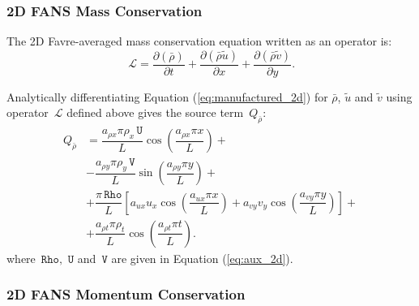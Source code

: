 \documentclass[10pt]{article}
\newcommand{\Diff}[2] {\dfrac{\partial( #1)}{\partial #2}}
\newcommand{\Rho}{\,\mathtt{Rho}}
\newcommand{\U}{\,\mathtt{U}}
\newcommand{\V}{\,\mathtt{V}}
\newcommand{\Lo}{\,\mathcal{L}}
\newcommand{\brho}{\bar{\rho}}
\newcommand{\tu}{\tilde{u}}
\newcommand{\tv}{\tilde{v}}
\begin{document}
\subsubsection{2D FANS Mass Conservation}

The 2D Favre-averaged mass conservation equation written as an operator is:
\begin{equation*}
  \Lo=\Diff{\brho }{t} +  \Diff{\brho \tu}{x}+\Diff{\brho \tv}{y}.
\end{equation*}

Analytically differentiating Equation (\ref{eq:manufactured_2d}) for $\brho$, $\tu$ and $\tv$ using operator $\Lo$ defined above gives  the source term~$Q_{\brho}$:
\begin{equation}
 \begin{split}
Q_{\brho} &= \dfrac{a_{\rho x} \pi \rho_x \U }{L}\cos\left(\dfrac{a_{\rho x} \pi x}{L}\right)+\\
&-\dfrac{a_{\rho y} \pi \rho_y \V }{L}\sin\left(\dfrac{a_{\rho y} \pi y}{L}\right)+\\
&+\dfrac{\pi \Rho}{L}\left[a_{ux} u_x \cos\left(\dfrac{a_{ux} \pi x}{L}\right)+a_{vy} v_y \cos\left(\dfrac{a_{vy} \pi y}{L}\right)\right] +\\
&+\dfrac{a_{\rho t} \pi \rho_t }{L}\cos\left(\dfrac{a_{\rho t} \pi t}{L}\right).
 \end{split}
\end{equation}
where $\Rho,\,\U$ and $\V$ are given in Equation (\ref{eq:aux_2d}).

\subsubsection{2D FANS Momentum Conservation}
\end{document}
